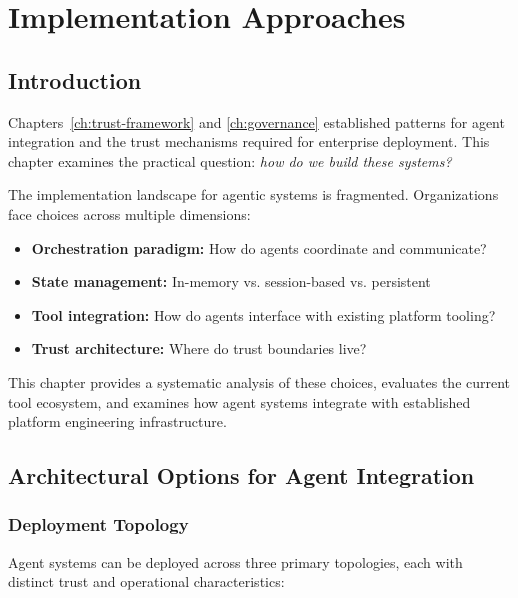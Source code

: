 \chapter{Implementation Approaches}
\label{ch:implementation}


\section{Introduction}
\label{sec:implementation-intro}

Chapters~\ref{ch:trust-framework} and \ref{ch:governance} established patterns for agent integration and the trust mechanisms required for enterprise deployment. This chapter examines the practical question: \textit{how do we build these systems?}

The implementation landscape for agentic systems is fragmented. Organizations face choices across multiple dimensions:

\begin{itemize}
    \item \textbf{Orchestration paradigm:} How do agents coordinate and communicate?
    \item \textbf{State management:} In-memory vs. session-based vs. persistent
    \item \textbf{Tool integration:} How do agents interface with existing platform tooling?
    \item \textbf{Trust architecture:} Where do trust boundaries live?
\end{itemize}

This chapter provides a systematic analysis of these choices, evaluates the current tool ecosystem, and examines how agent systems integrate with established platform engineering infrastructure.

\section{Architectural Options for Agent Integration}
\label{sec:architectural-options}

\subsection{Deployment Topology}
\label{subsec:deployment-topology}

Agent systems can be deployed across three primary topologies, each with distinct trust and operational characteristics:


